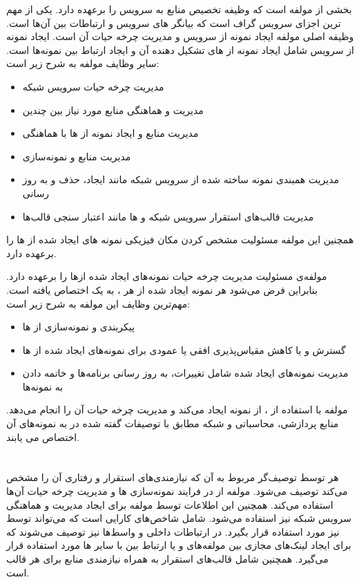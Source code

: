 بخشی از مولفه  است که وظیفه تخصیص منابع به سرویس را برعهده دارد.
یکی از مهم ترین اجزای سرویس گراف  است که بیانگر  های سرویس و ارتباطات بین آن‌ها است.
وظیفه اصلی مولفه  ایجاد نمونه از سرویس و مدیریت چرخه حیات آن است.
ایجاد نمونه از سرویس شامل ایجاد نمونه از ‌های تشکیل دهنده آن و ایجاد ارتباط بین نمونه‌ها است.
سایر وظایف مولفه  به شرح زیر است:
\begin{itemize}
    \item مدیریت چرخه حیات سرویس شبکه
    \item مدیریت و هماهنگی منابع مورد نیاز  بین چندین 
    \item مدیریت منابع و ایجاد نمونه از ‌ها با هماهنگی 
    \item مدیریت منابع و نمونه‌سازی 
    \item مدیریت همبندی نمونه ساخته شده از سرویس شبکه مانند ایجاد، حذف و به روز رسانی 
    \item مدیریت قالب‌های استقرار سرویس شبکه و ها مانند اعتبار سنجی قالب‌ها
\end{itemize}
همچنین این مولفه مسئولیت مشخص کردن مکان فیزیکی نمونه های ایجاد شده از ها را برعهده دارد.

مولفه‌ی  مسئولیت مدیریت چرخه حیات نمونه‌های ایجاد شده از‌ها را برعهده دارد.
بنابراین فرض می‌شود هر نمونه ایجاد شده از هر ، به یک  اختصاص یافته است.
مهم‌ترین وظایف این مولفه به شرح زیر است:
\begin{itemize}
    \item پیکربندی و نمونه‌سازی از ‌ها
    \item گسترش و یا کاهش مقیاس‌پذیری افقی یا عمودی برای نمونه‌های ایجاد شده از ها
    \item مدیریت نمونه‌های ایجاد شده شامل  تغییرات، به روز رسانی برنامه‌ها و خاتمه دادن به نمونه‌ها
\end{itemize}
مولفه  با استفاده از ، از  نمونه ایجاد می‌کند و
مدیریت چرخه حیات آن را انجام می‌دهد.
منابع پردازشی، محاسباتی و شبکه مطابق با توصیفات گفته شده در  به نمونه‌های آن اختصاص می یابند.

\section{}

هر  توسط توصیف‌گر مربوط به آن که نیازمندی‌های استقرار و رفتاری آن را مشخص می‌کند توصیف می‌شود.
مولفه  از  در فرایند نمونه‌سازی ‌ها و مدیریت چرخه حیات آن‌ها استفاده می‌کند.
همچنین این اطلاعات توسط مولفه  برای ایجاد مدیریت و هماهنگی سرویس شبکه نیز استفاده می‌شود.
 شامل شاخص‌های کارایی است که می‌تواند توسط  نیز مورد استفاده قرار بگیرد.
در  ارتباطات داخلی و واسط‌ها نیز توصیف می‌شوند که
برای ایجاد لینک‌های مجازی بین مولفه‌های  و یا ارتباط بین  با سایر ‌ها مورد استفاده قرار می‌گیرد.
 همچنین شامل قالب‌های استقرار  به همراه نیازمندی منابع برای هر قالب است.

